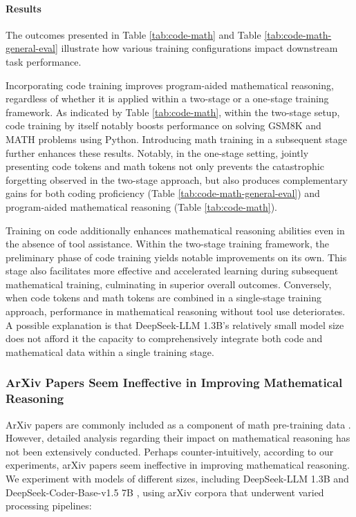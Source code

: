 \begin{itemize}[topsep=0pt]
\begin{itemize}[topsep=0pt]
\paragraph{Results}
The outcomes presented in Table \ref{tab:code-math} and Table \ref{tab:code-math-general-eval} illustrate how various training configurations impact downstream task performance.

Incorporating code training improves program-aided mathematical reasoning, regardless of whether it is applied within a two-stage or a one-stage training framework. As indicated by Table \ref{tab:code-math}, within the two-stage setup, code training by itself notably boosts performance on solving GSM8K and MATH problems using Python. Introducing math training in a subsequent stage further enhances these results. Notably, in the one-stage setting, jointly presenting code tokens and math tokens not only prevents the catastrophic forgetting observed in the two-stage approach, but also produces complementary gains for both coding proficiency (Table \ref{tab:code-math-general-eval}) and program-aided mathematical reasoning (Table \ref{tab:code-math}).

Training on code additionally enhances mathematical reasoning abilities even in the absence of tool assistance. Within the two-stage training framework, the preliminary phase of code training yields notable improvements on its own. This stage also facilitates more effective and accelerated learning during subsequent mathematical training, culminating in superior overall outcomes. Conversely, when code tokens and math tokens are combined in a single-stage training approach, performance in mathematical reasoning without tool use deteriorates. A possible explanation is that DeepSeek-LLM 1.3B’s relatively small model size does not afford it the capacity to comprehensively integrate both code and mathematical data within a single training stage.

\subsubsection{ArXiv Papers Seem Ineffective in Improving Mathematical Reasoning}

ArXiv papers are commonly included as a component of math pre-training data \citep{minerva,gpt-f,llemma,mathpile}. However, detailed analysis regarding their impact on mathematical reasoning has not been extensively conducted. Perhaps counter-intuitively, according to our experiments, arXiv papers seem ineffective in improving mathematical reasoning. We experiment with models of different sizes, including DeepSeek-LLM 1.3B and DeepSeek-Coder-Base-v1.5 7B \citep{deepseek-coder}, using arXiv corpora that underwent varied processing pipelines:


\end{itemize}
\end{itemize}
